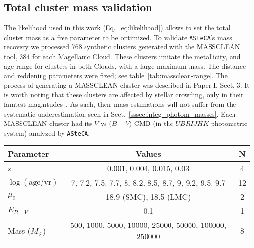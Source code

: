 \documentclass{aa}
\begin{document}
\begin{appendix}

\section{Total cluster mass validation}
\label{apdx:mass_valid}

The likelihood used in this work (Eq.~\ref{eq:likelihood}) allows
to set the total cluster mass as a free parameter to be optimized.
To validate \texttt{ASteCA}'s mass recovery we processed 768 synthetic
clusters generated with the MASSCLEAN tool, 384 for each Magellanic Cloud.
%
These clusters imitate the metallicity, and age range for clusters in
both Clouds, with a large maximum mass. The distance and reddening parameters
were fixed; see table~\ref{tab:massclean-range}.
The process of generating a MASSCLEAN cluster was described in Paper I, Sect. 3.
It is worth noting that these clusters are affected by stellar crowding,
only in their faintest magnitudes~\citep[using a theoretical
completeness function similar to that presented in][]{Small_2013}. As such,
their mass estimations will not suffer from the systematic underestimation seen
in Sect.~\ref{sssec:integ_photom_masses}.
%
Each MASSCLEAN cluster had its $V$ vs ($B-V)$ CMD (in the $UBRIJHK$ photometric
system) analyzed by \texttt{ASteCA}.

\begin{table*}
\centering
\caption{Parameter values used to generate the set of 768 MASSCLEAN clusters.}
\label{tab:massclean-range}
\begin{tabular}{lcc}
\hline\hline
 Parameter & Values & N\\
\hline
z & 0.001, 0.004, 0.015, 0.03 & 4\\
$\log\mathrm{(age/yr)}$ & 7, 7.2, 7.5, 7.7, 8, 8.2, 8.5, 8.7, 9, 9.2, 9.5, 9.7 &
12\\
$\mu_0$ & 18.9 (SMC), 18.5 (LMC) & 2\\
$E_{B-V}$ & 0.1 & 1\\
Mass ($M_{\odot}$) & 500, 1000, 5000, 10000, 25000, 50000, 100000, 250000 & 8\\
\hline
\end{tabular}
\end{table*}


\end{appendix}
\end{document}

